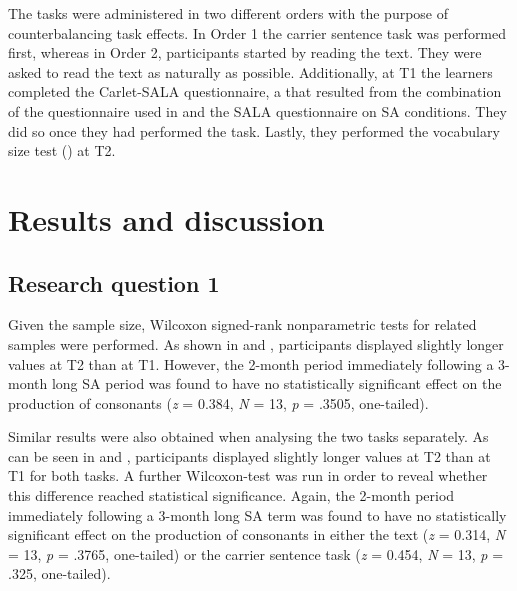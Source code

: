\documentclass[output=paper]{langsci/langscibook}
\begin{document}
The tasks were administered in two different orders with the purpose of counterbalancing task effects. In Order 1 the carrier sentence task was performed first, whereas in Order 2, participants started by reading the text. They were asked to read the text as naturally as possible. Additionally, at T1 the learners completed the Carlet-SALA questionnaire, a  that resulted from the combination of the questionnaire used in \citet{Carlet2017} and the SALA questionnaire on SA conditions. They did so once they had performed the task. Lastly, they performed the vocabulary size test (\citealt{Meara2005,MearaMiralpeix2006}) at T2.



\section{Results and discussion}


\subsection{{Research question 1}}



Given the sample size, Wilcoxon signed-rank nonparametric tests for related samples were performed. As shown in  and , participants displayed slightly longer  values at T2 than at T1. However, the 2-month  period immediately following a 3-month long SA period was found to have no statistically significant effect on the  production of   consonants (\textit{z} = 0.384, \textit{N} = 13, \textit{p} = .3505, one-tailed).  



  Similar results were also obtained when analysing the two tasks separately. As can be seen in  and , participants displayed slightly longer  values at T2 than at T1 for both tasks. A further Wilcoxon-test was run in order to reveal whether this difference reached statistical significance. Again, the 2-month  period immediately following a 3-month long SA term was found to have no statistically significant effect on the  production of   consonants in either the text (\textit{z} = 0.314, \textit{N} = 13, \textit{p} = .3765, one-tailed) or the carrier sentence task (\textit{z} = 0.454, \textit{N} = 13, \textit{p} = .325, one-tailed). 
\end{document}
